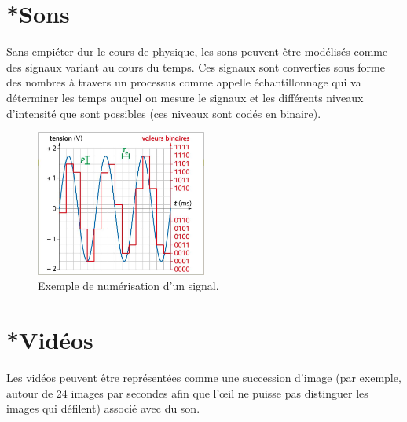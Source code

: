 \section{*Sons}
Sans empiéter dur le cours de physique, les sons peuvent être modélisés comme des signaux variant au cours du temps. Ces signaux sont converties sous forme des nombres à travers un processus comme appelle échantillonnage qui va déterminer les temps auquel on mesure le signaux et les différents niveaux d'intensité que sont possibles (ces niveaux sont codés en binaire).

\begin{figure}[h!]
	\centering
	\includegraphics[trim=10 0 60 0,width=0.5\textwidth]{Images/codage_information/illustration_echantillonage.jpg}
	\caption{Exemple de numérisation d'un signal.}
\end{figure}
\vspace{-0.5cm}
\section{*Vidéos}
Les vidéos peuvent être représentées comme une succession d'image (par exemple, autour de 24  images par secondes afin que l’œil ne puisse pas distinguer les images qui défilent) associé avec du son. 